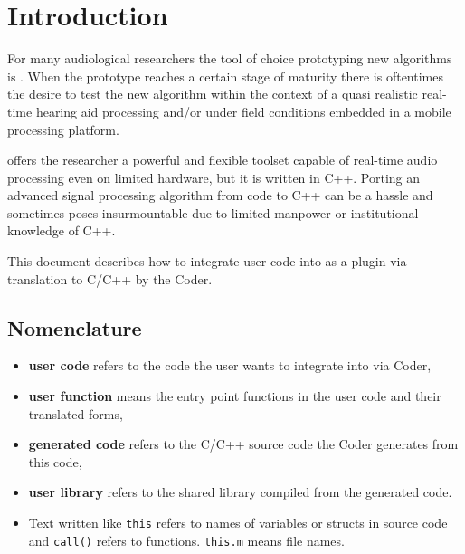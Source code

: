 \documentclass[11pt,a4paper,twoside]{article}
\newcommand{\+}{\discretionary{\mbox{\scriptsize$\hookleftarrow$}}{}{}}
\begin{document}
\newpage
\MHAcopyright{}
\newpage
\tableofcontents
\newpage
{}
\section{Introduction}
\label{section:Introduction}

For many audiological researchers the tool of choice prototyping new algorithms is \Matlab{}.
When the prototype reaches a certain stage of maturity there is oftentimes the desire to test
the new algorithm within the context of a quasi realistic real-time hearing aid processing and/or
under field conditions embedded in a mobile processing platform.

\mha{} offers the researcher a powerful and flexible toolset capable of real-time audio processing
even on limited hardware, but it is written in C++. Porting an advanced signal processing algorithm
from \Matlab{} code to C++ can be a hassle and sometimes poses insurmountable due to limited manpower
or institutional knowledge of C++. 


This document describes how to integrate user \Matlab{} code into \mha{}
as a plugin via translation to C/C++ by the \Matlab{} Coder.


\subsection*{Nomenclature}
\begin{itemize}
\item \textbf{user code} refers to the \Matlab{} code the user wants to integrate
  into \mha{} via \Matlab{} Coder,
\item \textbf{user function} means the entry point functions in the user code and
  their translated forms,
\item \textbf{generated code} refers to the C/C++ source code the
  Coder generates from this code,
\item \textbf{user library} refers to the shared library compiled
  from the generated code.
\item Text written like \texttt{this} refers to names of variables or structs in
  source code and \texttt{call()} refers to functions. \texttt{this.m} means
  file names.
\end{itemize}
\end{document}
